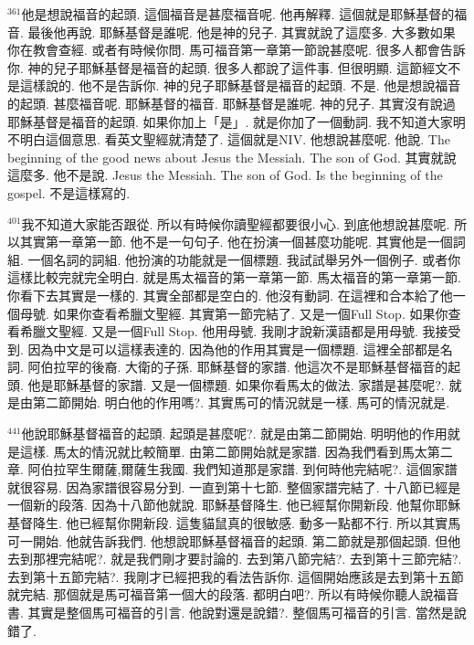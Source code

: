 \documentclass{book}
\begin{document}
$^{361}$他是想說福音的起頭.
這個福音是甚麼福音呢.
他再解釋.
這個就是耶穌基督的福音.
最後他再說.
耶穌基督是誰呢.
他是神的兒子.
其實就說了這麼多.
大多數如果你在教會查經.
或者有時候你問.
馬可福音第一章第一節說甚麼呢.
很多人都會告訴你.
神的兒子耶穌基督是福音的起頭.
很多人都說了這件事.
但很明顯.
這節經文不是這樣說的.
他不是告訴你.
神的兒子耶穌基督是福音的起頭.
不是.
他是想說福音的起頭.
甚麼福音呢.
耶穌基督的福音.
耶穌基督是誰呢.
神的兒子.
其實沒有說過耶穌基督是福音的起頭.
如果你加上「是」.
就是你加了一個動詞.
我不知道大家明不明白這個意思.
看英文聖經就清楚了.
這個就是NIV.
他想說甚麼呢.
他說.
The beginning of the good news about Jesus the Messiah.
The son of God.
其實就說這麼多.
他不是說.
Jesus the Messiah.
The son of God.
Is the beginning of the gospel.
不是這樣寫的.

$^{401}$我不知道大家能否跟從.
所以有時候你讀聖經都要很小心.
到底他想說甚麼呢.
所以其實第一章第一節.
他不是一句句子.
他在扮演一個甚麼功能呢.
其實他是一個詞組.
一個名詞的詞組.
他扮演的功能就是一個標題.
我試試舉另外一個例子.
或者你這樣比較完就完全明白.
就是馬太福音的第一章第一節.
馬太福音的第一章第一節.
你看下去其實是一樣的.
其實全部都是空白的.
他沒有動詞.
在這裡和合本給了他一個母號.
如果你查看希臘文聖經.
其實第一節完結了.
又是一個Full Stop.
如果你查看希臘文聖經.
又是一個Full Stop.
他用母號.
我剛才說新漢語都是用母號.
我接受到.
因為中文是可以這樣表達的.
因為他的作用其實是一個標題.
這裡全部都是名詞.
阿伯拉罕的後裔.
大衛的子孫.
耶穌基督的家譜.
他這次不是耶穌基督福音的起頭.
他是耶穌基督的家譜.
又是一個標題.
如果你看馬太的做法.
家譜是甚麼呢?.
就是由第二節開始.
明白他的作用嗎?.
其實馬可的情況就是一樣.
馬可的情況就是.

$^{441}$他說耶穌基督福音的起頭.
起頭是甚麼呢?.
就是由第二節開始.
明明他的作用就是這樣.
馬太的情況就比較簡單.
由第二節開始就是家譜.
因為我們看到馬太第二章.
阿伯拉罕生爾薩,爾薩生我國.
我們知道那是家譜.
到何時他完結呢?.
這個家譜就很容易.
因為家譜很容易分到.
一直到第十七節.
整個家譜完結了.
十八節已經是一個新的段落.
因為十八節他就說.
耶穌基督降生.
他已經幫你開新段.
他幫你耶穌基督降生.
他已經幫你開新段.
這隻貓鼠真的很敏感.
動多一點都不行.
所以其實馬可一開始.
他就告訴我們.
他想說耶穌基督福音的起頭.
第二節就是那個起頭.
但他去到那裡完結呢?.
就是我們剛才要討論的.
去到第八節完結?.
去到第十三節完結?.
去到第十五節完結?.
我剛才已經把我的看法告訴你.
這個開始應該是去到第十五節就完結.
那個就是馬可福音第一個大的段落.
都明白吧?.
所以有時候你聽人說福音書.
其實是整個馬可福音的引言.
他說對還是說錯?.
整個馬可福音的引言.
當然是說錯了.
\end{document}
